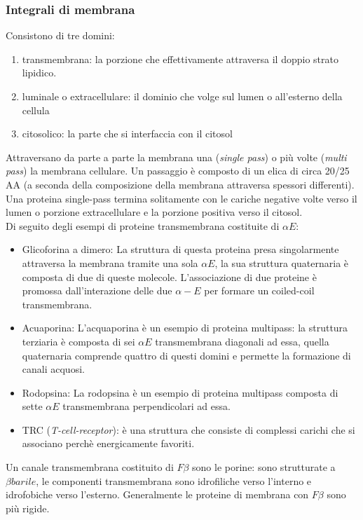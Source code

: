         \subsubsection{Integrali di membrana}
            Consistono di tre domini:
            \begin{enumerate}
                \item transmembrana: la porzione che effettivamente attraversa il doppio strato lipidico.
                \item luminale o extracellulare: il dominio che volge sul lumen o all'esterno della cellula
                \item citosolico: la parte che si interfaccia con il citosol
            \end{enumerate}
            Attraversano da parte a parte la membrana una (\textit{single pass}) o più volte (\textit{multi pass}) la membrana cellulare. Un passaggio è composto di un elica di circa 20/25 AA (a seconda della composizione della membrana attraversa spessori differenti).\\
            Una proteina single-pass termina solitamente con le cariche negative volte verso il lumen o porzione extracellulare e la porzione positiva verso il citosol.\\
            Di seguito degli esempi di proteine transmembrana costituite di $\alpha E$:
            \begin{itemize}
                \item {Glicoforina a dimero}:
                La struttura di questa proteina presa singolarmente attraversa la membrana tramite una sola $\alpha E$, la sua struttura quaternaria è composta di due di queste molecole.
                L'associazione di due proteine è promossa dall'interazione delle due $\alpha -E$ per formare un coiled-coil transmembrana.
                \item{Acuaporina}:
                L'acquaporina è un esempio di proteina multipass: la struttura terziaria è composta di sei $\alpha E$ transmembrana diagonali ad essa, quella quaternaria comprende quattro di questi domini e permette la formazione di canali acquosi.
                \item{Rodopsina}:
                La rodopsina è un esempio di proteina multipass composta di sette $\alpha E$ transmembrana perpendicolari ad essa.
                \item{TRC (\textit{T-cell-receptor})}:
                è una struttura che consiste di complessi carichi che si associano perchè energicamente favoriti.
            \end{itemize}
            Un canale transmembrana costituito di $F\beta$ sono le porine: sono strutturate a $\beta barile$, le componenti transmembrana sono idrofiliche verso l'interno e idrofobiche verso l'esterno. Generalmente le proteine di membrana con $F\beta$ sono più rigide.
            
